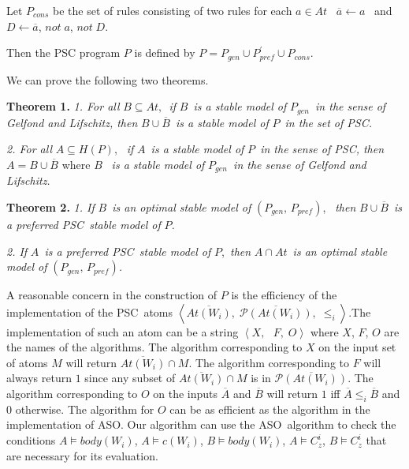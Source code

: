 \documentclass[letterpaper]{article}\usepackage{aaai}
\begin{document}
Let $P_{cons}$ be the set of rules consisting of two rules for each $a\in At$
\ $\overline{a}\leftarrow a$ \ and $D\leftarrow\overline{a}$, $not\;a$,
$not\;D$.

Then the PSC program $P$ is defined by $P=P_{gen}\cup P_{pref}^{\prime}\cup
P_{cons}$.

We can prove the following two theorems.

\textbf{Theorem 1. }\textit{1. For all }$B\subseteq At,$\textit{\ if }$B$\textit{\ is a stable model of }$P_{gen}$\textit{\ in the sense of Gelfond
and Lifschitz, then }$B\cup\overline{B}$\textit{\ is a stable model of }$P$\textit{\ in the set of PSC.}

\textit{2. For all }$A\subseteq H\left(  P\right)  $, \textit{\ if }$A$\textit{\ is a stable model of }$P$\textit{\ in the sense of PSC, then }$A=
B \cup\overline{B}$ where $B$ \textit{\ is a stable model of }$P_{gen}$\textit{\ in the sense of Gelfond and Lifschitz.}

\textbf{Theorem 2. }\textit{1. If }$B$\textit{\ is an optimal stable model of
}$\left(  P_{gen}\text{, }P_{pref}\right)  $, \textit{\ then }$B\cup
\overline{B}$\textit{\ is a preferred PSC\ stable model of }$P$\textit{.}

\textit{2. If }$A$\textit{\ is a preferred PSC\ stable model of }$P$,\textit{\ then }$A\cap At$\textit{\ is an optimal stable model of
}$\left(  P_{gen}\text{, }P_{pref}\right)  $\textit{.} \newline

A reasonable concern in the construction of $P$ is the efficiency of the
implementation of the PSC\ atoms $\left\langle \overline{At\left(
W_{i}\right)  },\;\overline{\mathcal{P}\left(  At\left(  W_{i}\right)
\right)  },\;\leq_{i}\right\rangle $.The implementation of such an atom can be
a string $\left\langle X,\text{ }F,\;O\right\rangle $ where $X$, $F$, $O$ are
the names of the algorithms. The algorithm corresponding to $X$ on the input
set of atoms $M$ will return $\overline{At\left(  W_{i}\right)  }\cap M$. The
algorithm corresponding to $F$ will always return $1$ since any subset of
$\overline{At\left(  W_{i}\right)  }\cap M$ is in $\overline{\mathcal{P}\left(  At\left(  W_{i}\right)  \right)  }$. The algorithm corresponding to
$O$ on the inputs $\overline{A}$ and $\overline{B}$ will return $1$ iff
$\overline{A}\leq_{i}\overline{B}$ and $0$ otherwise. The algorithm for $O$
can be as efficient as the algorithm in the implementation of ASO. Our
algorithm can use the ASO\ algorithm to check the conditions $A\models
body\left(  W_{i}\right)  $, $A\models c\left(  W_{i}\right)  $, $B\models
body\left(  W_{i}\right)  $, $A\models C_{z}^{i}$, $B\models C_{z}^{i}$ that
are necessary for its evaluation.
\end{document}
